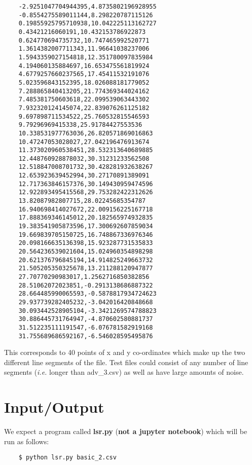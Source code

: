 \documentclass[10pt]{article}
\begin{document}
\begin{verbatim}
    -2.9251047704944395,4.8735802196928955
    -0.8554275589011144,8.298220787115126
    0.19855925795710938,10.042225113162727
    0.43421216060191,10.432153786922873
    0.624770694735732,10.747465992520771
    1.3614382007711343,11.96641038237006
    1.5943359027154818,12.351780097835984
    4.194060135884697,16.653475561819924
    4.6779257660237565,17.45411532191076
    5.023596843152395,18.026088181779052
    7.288865840413205,21.774369344024162
    7.485381750603618,22.099539063443302
    7.932320124145074,22.839076261125182
    9.697898711534522,25.760532815546593
    9.79296969415338,25.91784427553536
    10.338531977763036,26.820571869016863
    10.47247053028027,27.042196476913674
    11.373020960538451,28.532313640689885
    12.448760928878032,30.31231233562508
    12.518847008701732,30.428281932638267
    12.653923639452994,30.27170891389091
    12.717363846157376,30.149430959474596
    12.922893495415568,29.753282422312626
    13.82087982807715,28.02245685354787
    16.940698414027672,22.009156225167718
    17.888369346145012,20.182565974932835
    19.383541905873596,17.300692607859034
    19.669839705150725,16.748867336976346
    20.098166635136398,15.923287731535833
    20.564236539021604,15.024960354898298
    20.621376796845194,14.914825249663732
    21.505205350325678,13.211288120947877
    27.70770290983017,1.2562716850382856
    28.51062072023851,-0.2913138686887322
    28.664485990065593,-0.5878817934724623
    29.937739282405232,-3.042016420848668
    30.093442528905104,-3.3421269574788823
    30.886445731764947,-4.870602580881737
    31.512235111191547,-6.076781582919168
    31.755689686592167,-6.546028595495876
\end{verbatim}

This corresponds to 40 points of x and y co-ordinates which make up the two different line segments of the file. 
Test files could consist of any number of line segments (\textit{i.e.} longer than adv\_3.csv) as well as have large amounts of noise. 

\section{Input/Output}
\label{sec:IO}

We expect a program called \textbf{lsr.py} (\textbf{not a jupyter notebook}) which will be run as follows:
\begin{verbatim}
    $ python lsr.py basic_2.csv
\end{verbatim}
\end{document}
